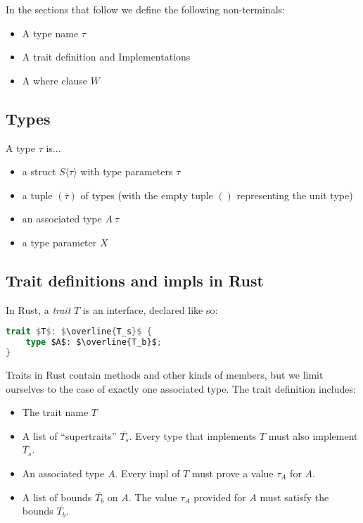 \documentclass[sn-mathphys-num]{sn-jnl}%
\theoremstyle{thmstyleone}%
\theoremstyle{thmstyletwo}%
\theoremstyle{thmstylethree}%
\begin{document}
In the sections that follow we define the following non-terminals:

\begin{itemize}
    \item A type name $\tau$
    \item A trait definition and Implementations
    \item A where clause $W$
\end{itemize}

\subsection{Types}

A type $\tau$ is...

\begin{itemize}
    \item a struct $S\langle\overline{\tau}\rangle$ with type parameters $\overline{\tau}$
    \item a tuple $(\overline{\tau})$ of types (with the empty tuple $()$ representing the unit type)
    \item an associated type $A\:\tau$
    \item a type parameter $X$
\end{itemize}

\subsection{Trait definitions and impls in Rust}

In Rust, a \emph{trait} $T$ is an interface, declared like so:

\begin{lstlisting}[language=Rust]
trait $T$: $\overline{T_s}$ {
    type $A$: $\overline{T_b}$;
}
\end{lstlisting}

Traits in Rust contain methods and other kinds of members,
but we limit ourselves to the case of exactly one associated type.
The trait definition includes:

\begin{itemize}
    \item The trait name $T$
    \item A list of ``supertraits'' $\overline{T_s}$. Every type that implements $T$ must also implement $\overline{T_s}$.
    \item An associated type $A$. Every impl of $T$ must prove a value $\tau_A$ for $A$.
    \item A list of bounds $\overline{T_b}$ on $A$. The value $\tau_A$ provided for $A$ must satisfy the bounds $\overline{T_b}$.
\end{itemize}
\end{document}
